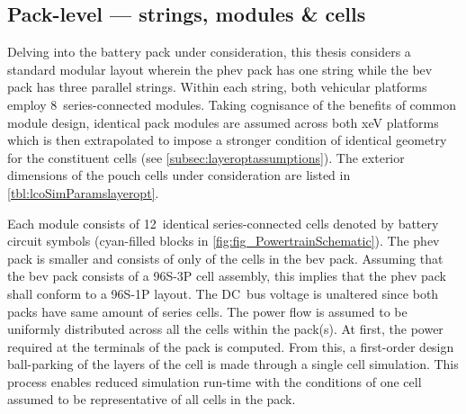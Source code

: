 \subsection{Pack-level --- strings, modules \& cells}\label{sec:packlevelhierarchy}

Delving  into the  battery pack  under  consideration, this  thesis considers  a
standard  modular  layout wherein  the  \gls{phev}  pack  has one  string  while
the  \gls{bev}  pack  has  three  parallel strings.  Within  each  string,  both
vehicular  platforms employ  8~series-connected  modules.  Taking cognisance  of
the  benefits  of common  module  design,  identical  pack modules  are  assumed
across  both  \gls{xeV}  platforms  which  is  then  extrapolated  to  impose  a
stronger  condition  of  identical  geometry  for  the  constituent  cells  (see
\cref{subsec:layeroptassumptions}). The  exterior dimensions of the  pouch cells
under consideration are listed in \cref{tbl:lcoSimParamslayeropt}.

Each module consists  of 12~identical series-connected cells  denoted by battery
circuit symbols (cyan-filled  blocks in \cref{fig:fig_PowertrainSchematic}). The
\gls{phev} pack is  smaller and consists of only   of the cells in
the \gls{bev} pack. Assuming that the \gls{bev} pack consists of a \mbox{96S-3P}
cell  assembly,  this implies  that  the  \gls{phev}  pack  shall conform  to  a
\mbox{96S-1P} layout. The DC~bus voltage is unaltered since both packs have same
amount of  series cells. The power  flow is assumed to  be uniformly distributed
across all  the cells within  the pack(s). At first,  the power required  at the
terminals of the  pack is computed. From this, a  first-order design ball-parking
of the layers of the cell is made through a single cell simulation. This process
enables reduced simulation run-time with the conditions of one cell assumed to be
representative of all cells in the pack.




